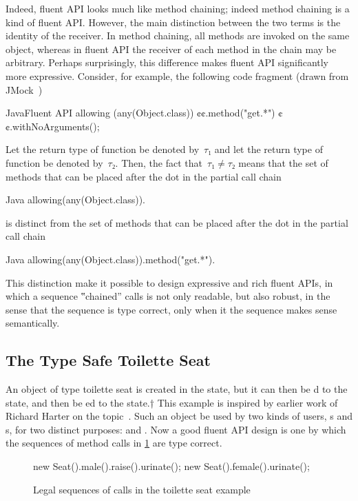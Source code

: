 Indeed, fluent API looks much like method chaining; indeed method chaining is a kind
  of fluent API{}.
However, the main distinction between the two terms is the identity of the receiver.
In method chaining, all methods are invoked on the same object, whereas in fluent API
  the receiver of each method in the chain may be arbitrary.
Perhaps surprisingly, this difference makes fluent API significantly more expressive.
Consider, for example, the following code fragment (drawn from JMock~\cite{Freeman:Pryce:06})
\begin{Code}{Java}{Fluent API}
allowing (any(Object.class))
  ¢¢.method("get.*")
  ¢¢.withNoArguments();
\end{Code}
Let the return type of function  be denoted by~$τ₁$ and let the return type of function  be denoted by~$τ₂$.
Then, the fact that~$τ₁≠τ₂$ means that the set of methods that can be placed after the dot
in the partial call chain
\begin{code}{Java}
 allowing(any(Object.class)).
\end{code}
is distinct from the set of methods that can be placed after the dot in the partial call chain
\begin{code}{Java}
allowing(any(Object.class)).method("get.*").
\end{code}
This distinction make it possible to design expressive and rich fluent APIs, in which a sequence ‟chained” calls is not only readable, but also
robust, in the sense that the sequence is type correct, only when it the sequence makes sense semantically.

\subsection{The Type Safe Toilette Seat}

An object of type toilette seat is created in the  state, but it can
then be d to the  state, and then be ed to the
 state.†{%
  This example is inspired by earlier work of
  Richard Harter on the topic~\cite{Harter:05}.
}
Such an object be used by two kinds of users, s and s, for two distinct purposes:  and .
Now a good fluent API design is one by which the sequences of method calls in
\cref{Figure:toilette:legal} are type correct.

\begin{figure}[htbp]
  \begin{JAVA}
new Seat().male().raise().urinate();
new Seat().female().urinate();
  \end{JAVA}
  \caption{Legal sequences of calls in the toilette seat example}
  \label{Figure:toilette:legal}
\end{figure}

